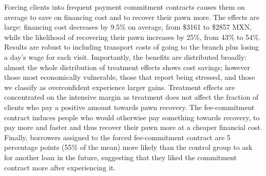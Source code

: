 \documentclass[oneside,11pt]{article}
\begin{document}
Forcing clients into frequent payment commitment contracts causes them on average to save on financing cost and to recover their pawn more. The effects are large: financing cost decreases by 9.5\% on average, from \$3161 to \$2857 MXN, while the likelihood of recovering their pawn increases by 25\%, from 43\% to 54\%. Results are robust to including transport costs of going to the branch plus losing a day's wage for each visit. Importantly, the benefits are distributed broadly: almost the whole distribution of treatment effects shows cost savings; however those most economically vulnerable, those that report being stressed, and those we classify as overconfident experience larger gains. %
Treatment effects are concentrated on the intensive margin as treatment does not affect the fraction of clients who pay a positive amount towards pawn recovery. The fee-commitment contract induces people who would otherwise pay something towards recovery, to pay more and faster and thus recover their pawn more at a cheaper financial cost. Finally, borrowers assigned to the forced fee-commitment contract are 5 percentage points (55\% of the mean) more likely than the control group to ask for another loan in the future, suggesting that they liked the commitment contract more after experiencing it.

\end{document}
